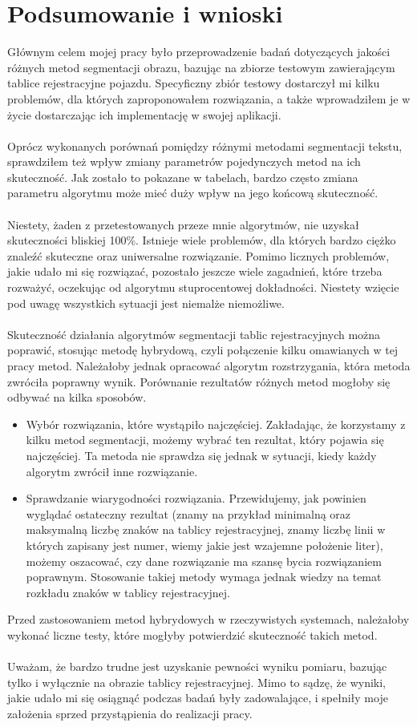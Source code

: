\section{Podsumowanie i wnioski}
Głównym celem mojej pracy było przeprowadzenie badań dotyczących jakości różnych metod segmentacji obrazu, bazując na zbiorze testowym zawierającym tablice rejestracyjne pojazdu. Specyficzny zbiór testowy dostarczył mi kilku problemów, dla których zaproponowałem rozwiązania, a także wprowadziłem je w życie dostarczając ich implementację w swojej aplikacji.
\paragraph{}
Oprócz wykonanych porównań pomiędzy różnymi metodami segmentacji tekstu, sprawdziłem też wpływ zmiany parametrów pojedynczych metod na ich skuteczność. Jak zostało to pokazane w tabelach, bardzo często zmiana parametru algorytmu może mieć duży wpływ na jego końcową skuteczność.
\paragraph{}
Niestety, żaden z przetestowanych przeze mnie algorytmów, nie uzyskał skuteczności bliskiej 100\%. Istnieje wiele problemów, dla których bardzo ciężko znaleźć skuteczne oraz uniwersalne rozwiązanie. Pomimo licznych problemów, jakie udało mi się rozwiązać, pozostało jeszcze wiele zagadnień, które trzeba rozważyć, oczekując od algorytmu stuprocentowej dokładności. Niestety wzięcie pod uwagę wszystkich sytuacji jest niemalże niemożliwe.
\paragraph{}
Skuteczność działania algorytmów segmentacji tablic rejestracyjnych można poprawić, stosując metodę hybrydową, czyli połączenie kilku omawianych w tej pracy metod. Należałoby jednak opracować algorytm rozstrzygania, która metoda zwróciła poprawny wynik. Porównanie rezultatów różnych metod mogłoby się odbywać na kilka sposobów.
\begin{itemize}
  \item Wybór rozwiązania, które wystąpiło najczęściej. Zakładając, że korzystamy z kilku metod segmentacji, możemy wybrać ten rezultat, który pojawia się najczęściej. Ta metoda nie sprawdza się jednak w sytuacji, kiedy każdy algorytm zwrócił inne rozwiązanie.
    \item Sprawdzanie wiarygodności rozwiązania. Przewidujemy, jak powinien wyglądać ostateczny rezultat (znamy na przykład minimalną oraz maksymalną liczbę znaków na tablicy rejestracyjnej, znamy liczbę linii w których zapisany jest numer, wiemy jakie jest wzajemne położenie liter), możemy oszacować, czy dane rozwiązanie ma szansę bycia rozwiązaniem poprawnym. Stosowanie takiej metody wymaga jednak wiedzy na temat rozkładu znaków w tablicy rejestracyjnej.
\end{itemize}
Przed zastosowaniem metod hybrydowych w rzeczywistych systemach, należałoby wykonać liczne testy, które mogłyby potwierdzić skuteczność takich metod.
\paragraph{}
Uważam, że bardzo trudne jest uzyskanie pewności wyniku pomiaru, bazując tylko i wyłącznie na obrazie tablicy rejestracyjnej. Mimo to sądzę, że wyniki, jakie udało mi się osiągnąć podczas badań były zadowalające, i spełniły moje założenia sprzed przystąpienia do realizacji pracy.
